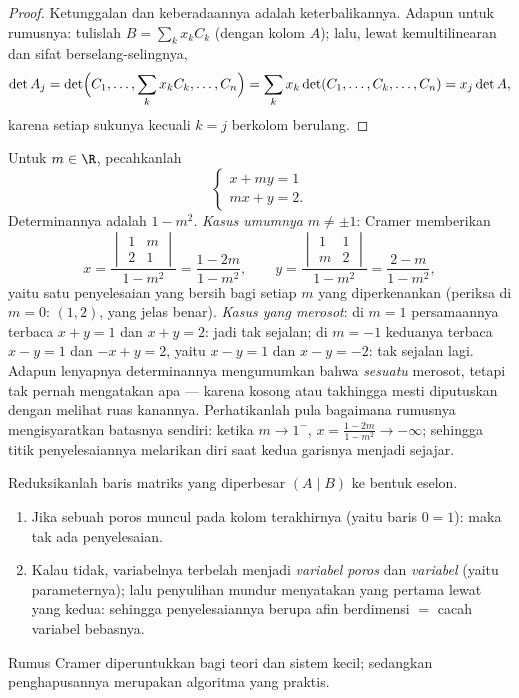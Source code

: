 \begin{proof}
Ketunggalan dan keberadaannya adalah keterbalikannya. Adapun untuk rumusnya:
tulislah $B = \sum_k x_k C_k$ (dengan kolom $A$); lalu, lewat
kemultilinearan dan sifat berselang-selingnya,
\[
\det A_j = \det\Bigl(C_1, \dots, \sum_k x_k C_k, \dots, C_n\Bigr)
= \sum_k x_k \det(C_1, \dots, C_k, \dots, C_n)
= x_j \det A ,
\]
karena setiap sukunya kecuali $k = j$ berkolom berulang.
\end{proof}

\begin{example}
\label{ex:b1:det:cramerparameter}
Untuk $m \in \R$, pecahkanlah
\[
\begin{cases}
x + m y = 1\\
m x + y = 2 .
\end{cases}
\]
Determinannya adalah $1 - m^2$. \emph{Kasus umumnya} $m \neq \pm1$:
Cramer memberikan
\[
x = \frac{\begin{vmatrix} 1 & m\\ 2 & 1\end{vmatrix}}{1 - m^2}
= \frac{1 - 2m}{1 - m^2},
\qquad
y = \frac{\begin{vmatrix} 1 & 1\\ m & 2\end{vmatrix}}{1 - m^2}
= \frac{2 - m}{1 - m^2},
\]
yaitu satu penyelesaian yang bersih bagi setiap $m$ yang diperkenankan (periksa di $m = 0$:
$(1, 2)$, yang jelas benar). \emph{Kasus yang merosot}: di $m = 1$
persamaannya terbaca $x + y = 1$ dan $x + y = 2$: jadi tak sejalan; di
$m = -1$ keduanya terbaca $x - y = 1$ dan $-x + y = 2$, yaitu $x - y =
1$ dan $x - y = -2$: tak sejalan lagi. Adapun lenyapnya
determinannya mengumumkan bahwa \emph{sesuatu} merosot, tetapi
tak pernah mengatakan apa --- karena kosong atau takhingga mesti diputuskan dengan melihat
ruas kanannya. Perhatikanlah pula bagaimana rumusnya mengisyaratkan
batasnya sendiri: ketika $m \to 1^{-}$, $x = \frac{1 - 2m}{1 - m^2} \to
-\infty$; sehingga titik penyelesaiannya melarikan diri saat kedua garisnya menjadi
sejajar.
\end{example}

\begin{method}\label{met:b1:det:gauss}
Reduksikanlah baris matriks yang diperbesar $(A \mid B)$ ke bentuk
eselon.
\begin{enumerate}
  \item Jika sebuah poros muncul pada kolom terakhirnya (yaitu baris $0 = 1$): maka tak ada
        penyelesaian.
  \item Kalau tidak, variabelnya terbelah menjadi \emph{variabel poros} dan
        \emph{variabel } (yaitu parameternya); lalu penyulihan mundur
        menyatakan yang pertama lewat yang kedua: sehingga  penyelesaiannya berupa
         afin berdimensi $=$ cacah variabel bebasnya.
\end{enumerate}
Rumus Cramer diperuntukkan bagi teori dan sistem kecil; sedangkan penghapusannya
merupakan algoritma yang praktis.
\end{method}

